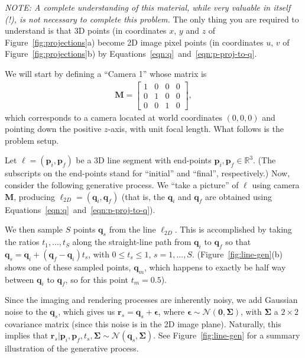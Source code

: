 \documentclass[10pt]{article}
\begin{document}
{\em NOTE: A complete understanding of this material, while very valuable in itself (!), is not necessary to complete this problem.}  The only thing you are required to understand is that 3D points (in coordinates $x$, $y$ and $z$ of Figure~\ref{fig:projections}a) become 2D image pixel points (in coordinates $u$, $v$ of Figure~\ref{fig:projections}b) by Equations~\ref{eqn:q}~and~\ref{eqn:p-proj-to-q}.

We will start by defining a ``Camera 1'' whose matrix is
\begin{eqnarray*}
\mathbf{M} = 
\begin{bmatrix}
1 & 0 & 0 & 0 \\
0 & 1 & 0 & 0 \\
0 & 0 & 1 & 0
\end{bmatrix},
\end{eqnarray*}
which corresponds to a camera located at world coordinates $(0,0,0)$ and pointing down the positive $z$-axis, with unit focal length.  What follows is the problem setup.

Let $\boldsymbol{\ell} = (\mathbf{p}_i, \mathbf{p}_f)$ be a 3D line segment with end-points $\mathbf{p}_i, \mathbf{p}_f \in \mathbb{R}^3$.  (The subscripts on the end-points stand for ``initial'' and ``final'', respectively.)  Now, consider the following generative process.  We ``take a picture'' of $\boldsymbol{\ell}$ using camera $\mathbf{M}$, producing $\boldsymbol{\ell}_{2D} = (\mathbf{q}_{i}, \mathbf{q}_{f})$ (that is, the $\mathbf{q}_{i}$ and $\mathbf{q}_{f}$ are obtained using Equations~\ref{eqn:q}~and~\ref{eqn:p-proj-to-q}).  

We then sample $S$ points $\mathbf{q}_s$ from the line $\boldsymbol{\ell}_{2D}$.  This is accomplished by taking the ratios $t_1, ..., t_S$ along the straight-line path from $\mathbf{q}_{i}$ to $\mathbf{q}_{f}$ so that $\mathbf{q}_s = \mathbf{q}_i + (\mathbf{q}_f - \mathbf{q}_i)t_s$, with $0 \leq t_s \leq 1$, $s = 1, ..., S$. (Figure~\ref{fig:line-gen}(b) shows one of these sampled points, $\mathbf{q}_m$, which happens to exactly be half way between $\mathbf{q}_{i}$ to $\mathbf{q}_{f}$, so for this point $t_m=0.5$).  

Since the imaging and rendering processes are inherently noisy, we add Gaussian noise to the $\mathbf{q}_s$, which gives us $\mathbf{r}_s = \mathbf{q}_s + \boldsymbol{\epsilon}$, where $\boldsymbol{\epsilon} \sim \mathcal{N}(\mathbf{0}, \boldsymbol{\Sigma})$, with $\boldsymbol{\Sigma}$ a $2 \times 2$ covariance matrix (since this noise is in the 2D image plane).  Naturally, this implies that $\mathbf{r}_s | \mathbf{p}_i, \mathbf{p}_f, t_s, \boldsymbol{\Sigma} \sim \mathcal{N}(\mathbf{q}_s, \boldsymbol{\Sigma})$.  See Figure~\ref{fig:line-gen} for a summary illustration of the generative process. 
\end{document}
